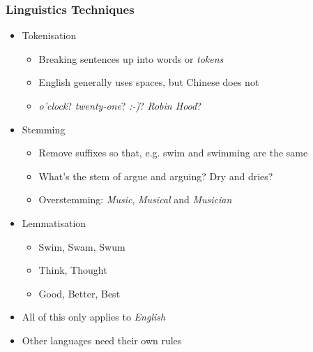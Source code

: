 \documentclass{beamer}
\begin{document}
\begin{frame}
  \frametitle{Linguistics Techniques}
  \begin{itemize}
    \pause \item Tokenisation
    \begin{itemize}
      \pause \item Breaking sentences up into words or \emph{tokens}
      \pause \item English generally uses spaces, but Chinese does not
      \pause \item \emph{o'clock}? \emph{twenty-one}? \emph{:-)}? \emph{Robin Hood}?
    \end{itemize}
    \pause \item Stemming
    \begin{itemize}
      \pause \item Remove suffixes so that, e.g.  swim and swimming are the same
      \pause \item What's the stem of argue and arguing? Dry and dries?
      \pause \item Overstemming: \emph{Music}, \emph{Musical} and \emph{Musician}
    \end{itemize}
    \pause \item Lemmatisation
    \begin{itemize}
      \pause \item Swim, Swam, Swum
      \pause \item Think, Thought
      \pause \item Good, Better, Best
    \end{itemize}
    \pause \item All of this only applies to \emph{English}
    \pause \item Other languages need their own rules
  \end{itemize}
\end{frame}
\end{document}
